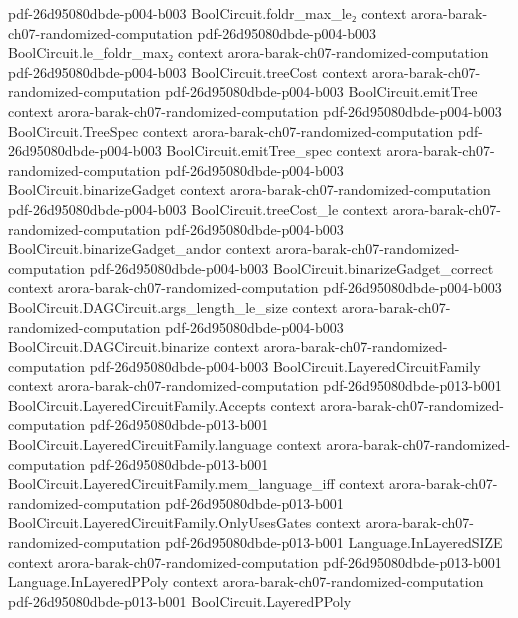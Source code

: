 \begin{theorem}
  {pdf-26d95080dbde-p004-b003}
\proofstep
  {BoolCircuit.foldr_max_le₂}
  {context}
  {arora-barak-ch07-randomized-computation}
  {pdf-26d95080dbde-p004-b003}
\proofstep
  {BoolCircuit.le_foldr_max₂}
  {context}
  {arora-barak-ch07-randomized-computation}
  {pdf-26d95080dbde-p004-b003}
\proofstep
  {BoolCircuit.treeCost}
  {context}
  {arora-barak-ch07-randomized-computation}
  {pdf-26d95080dbde-p004-b003}
\proofstep
  {BoolCircuit.emitTree}
  {context}
  {arora-barak-ch07-randomized-computation}
  {pdf-26d95080dbde-p004-b003}
\proofstep
  {BoolCircuit.TreeSpec}
  {context}
  {arora-barak-ch07-randomized-computation}
  {pdf-26d95080dbde-p004-b003}
\proofstep
  {BoolCircuit.emitTree_spec}
  {context}
  {arora-barak-ch07-randomized-computation}
  {pdf-26d95080dbde-p004-b003}
\proofstep
  {BoolCircuit.binarizeGadget}
  {context}
  {arora-barak-ch07-randomized-computation}
  {pdf-26d95080dbde-p004-b003}
\proofstep
  {BoolCircuit.treeCost_le}
  {context}
  {arora-barak-ch07-randomized-computation}
  {pdf-26d95080dbde-p004-b003}
\proofstep
  {BoolCircuit.binarizeGadget_andor}
  {context}
  {arora-barak-ch07-randomized-computation}
  {pdf-26d95080dbde-p004-b003}
\proofstep
  {BoolCircuit.binarizeGadget_correct}
  {context}
  {arora-barak-ch07-randomized-computation}
  {pdf-26d95080dbde-p004-b003}
\proofstep
  {BoolCircuit.DAGCircuit.args_length_le_size}
  {context}
  {arora-barak-ch07-randomized-computation}
  {pdf-26d95080dbde-p004-b003}
\proofstep
  {BoolCircuit.DAGCircuit.binarize}
  {context}
  {arora-barak-ch07-randomized-computation}
  {pdf-26d95080dbde-p004-b003}
\proofstep
  {BoolCircuit.LayeredCircuitFamily}
  {context}
  {arora-barak-ch07-randomized-computation}
  {pdf-26d95080dbde-p013-b001}
\proofstep
  {BoolCircuit.LayeredCircuitFamily.Accepts}
  {context}
  {arora-barak-ch07-randomized-computation}
  {pdf-26d95080dbde-p013-b001}
\proofstep
  {BoolCircuit.LayeredCircuitFamily.language}
  {context}
  {arora-barak-ch07-randomized-computation}
  {pdf-26d95080dbde-p013-b001}
\proofstep
  {BoolCircuit.LayeredCircuitFamily.mem_language_iff}
  {context}
  {arora-barak-ch07-randomized-computation}
  {pdf-26d95080dbde-p013-b001}
\proofstep
  {BoolCircuit.LayeredCircuitFamily.OnlyUsesGates}
  {context}
  {arora-barak-ch07-randomized-computation}
  {pdf-26d95080dbde-p013-b001}
\proofstep
  {Language.InLayeredSIZE}
  {context}
  {arora-barak-ch07-randomized-computation}
  {pdf-26d95080dbde-p013-b001}
\proofstep
  {Language.InLayeredPPoly}
  {context}
  {arora-barak-ch07-randomized-computation}
  {pdf-26d95080dbde-p013-b001}
\proofstep
  {BoolCircuit.LayeredPPoly}

\end{theorem}
